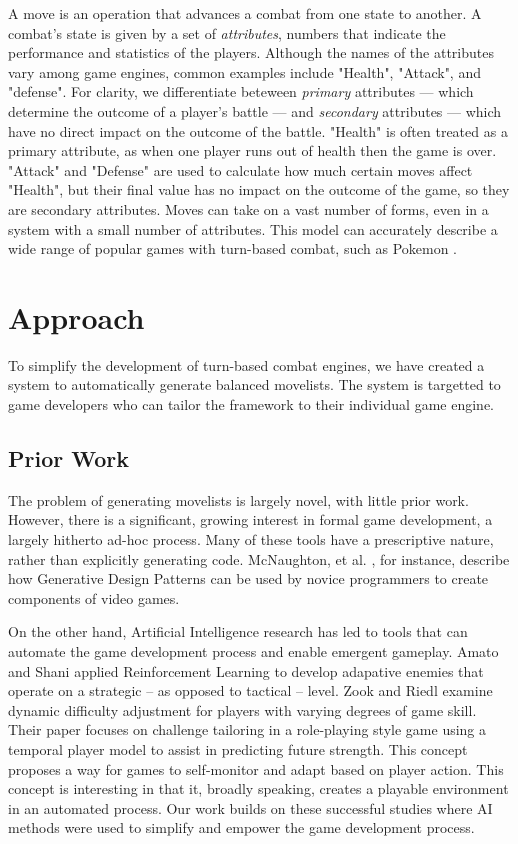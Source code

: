 \documentclass{acm_proc_article-sp}
\begin{document}
A move is an operation that advances a combat from one state to another. A combat's state is given by a set of \textit{attributes}, numbers that indicate the performance and statistics of the players. Although the names of the attributes vary among game engines, common examples include "Health", "Attack", and "defense". For clarity, we differentiate beteween \textit{primary} attributes --- which determine the outcome of a player's battle --- and \textit{secondary} attributes --- which have no direct impact on the outcome of the battle. "Health" is often treated as a primary attribute, as when one player runs out of health then the game is over. "Attack" and "Defense" are used to calculate how much certain moves affect "Health", but their final value has no impact on the outcome of the game, so they are secondary attributes. Moves can take on a vast number of forms, even in a system with a small number of attributes. This model can accurately describe a wide range of popular games with turn-based combat, such as Pokemon \cite{website:pokemon_calculations}.

\section{Approach}

To simplify the development of turn-based combat engines, we have created a system to automatically generate balanced movelists. The system is targetted to game developers who can tailor the framework to their individual game engine. 

\subsection{Prior Work}

The problem of generating movelists is largely novel, with little prior work. However, there is a significant, growing interest in formal game development, a largely hitherto ad-hoc process. Many of these tools have a prescriptive nature, rather than explicitly generating code. McNaughton, et al. \cite{generative_design_patterns}, for instance, describe how Generative Design Patterns can be used by novice programmers to create components of video games.

On the other hand, Artificial Intelligence research has led to tools that can automate the game development process and enable emergent gameplay. Amato and Shani\cite{reinforcement_strategy} applied Reinforcement Learning to develop adapative enemies that operate on a strategic -- as opposed to tactical -- level. Zook and Riedl \cite{dynamic_difficulty} examine dynamic difficulty adjustment for players with varying degrees of game skill. Their paper focuses on challenge tailoring in a role-playing style game using a temporal player model to assist in predicting future strength. This concept proposes a way for games to self-monitor and adapt based on player action. This concept is interesting in that it, broadly speaking, creates a playable environment in an automated process. Our work builds on these successful studies where AI methods were used to simplify and empower the game development process.
\end{document}
